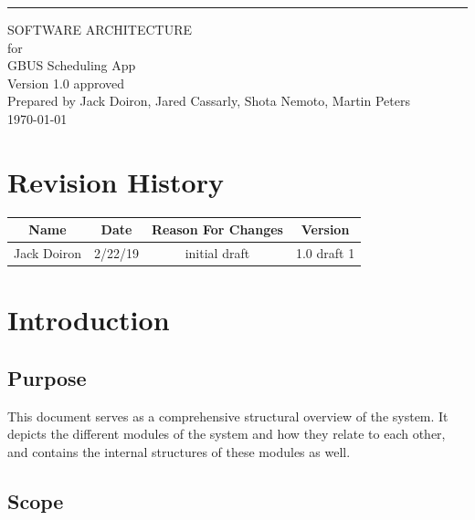 \documentclass{scrreprt}
\date{}
\def\myversion{1.0 }
\begin{document}
\begin{flushright}
    \rule{16cm}{5pt}\vskip1cm
    \begin{bfseries}
        \Huge{SOFTWARE ARCHITECTURE}\\
        \vspace{1.9cm}
        for\\
        \vspace{1.9cm}
        GBUS Scheduling App\\
        \vspace{1.9cm}
        \LARGE{Version \myversion approved}\\
        \vspace{1.9cm}
        Prepared by Jack Doiron, Jared Cassarly, Shota Nemoto, Martin Peters\\
        \vspace{1.9cm}
        \today\\
    \end{bfseries}
\end{flushright}

\tableofcontents


\chapter*{Revision History}

\begin{center}
    \begin{tabular}{|c|c|c|c|}
        \hline
	    Name & Date & Reason For Changes & Version\\
        \hline
	    Jack Doiron & 2/22/19 & initial draft & 1.0 draft 1\\
        \hline
    \end{tabular}
\end{center}

\chapter{Introduction}

\section{Purpose}

This document serves as a comprehensive structural overview of the system. It depicts the different modules of the system and how they relate to each other, and contains the internal structures of these modules as well.

\section{Scope}
\end{document}
